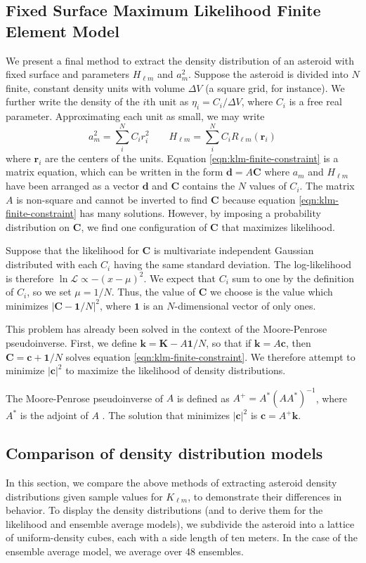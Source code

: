\documentclass{aastex631}
\begin{document}
\subsection{Fixed Surface Maximum Likelihood Finite Element Model}
\label{sec:like-density}
We present a final method to extract the density distribution of an asteroid with fixed surface and parameters $H_{\ell m}$ and $a_m^2$. Suppose the asteroid is divided into $N$ finite, constant density units with volume $\Delta V$ (a square grid, for instance). We further write the density of the $i$th unit as $\eta_i = C_i / \Delta V$, where $C_i$ is a free real parameter. Approximating each unit as small, we may write 
\begin{equation}
  a_m^2 = \sum_i^N C_i r_i^2 \qquad H_{\ell m} = \sum_i^N C_i R_{\ell m}(\bm r_i)
  \label{eqn:klm-finite-constraint}
\end{equation}
where $\bm r_i$ are the centers of the units. Equation \ref{eqn:klm-finite-constraint} is a matrix equation, which can be written in the form $\bm d = A \bm C$ where $a_m$ and $H_{\ell m}$ have been arranged as a vector $\bm d$ and $\bm C$ contains the $N$ values of $C_i$. The matrix $A$ is non-square and cannot be inverted to find $\bm C$ because equation \ref{eqn:klm-finite-constraint} has many solutions. However, by imposing a probability distribution on $\bm C$, we find one configuration of $\bm C$ that maximizes likelihood.

Suppose that the likelihood for $\bm C$ is multivariate independent Gaussian distributed with each $C_i$ having the same standard deviation. The log-likelihood is therefore $\ln \mathcal{L} \propto -(x - \mu)^2$. We expect that $C_{i}$ sum to one by the definition of $C_i$, so we set $\mu = 1/N$. Thus, the value of $\bm C$ we choose is the value which minimizes $|\bm C - \bm 1 /N|^2$, where $\bm 1$ is an $N$-dimensional vector of only ones.

This problem has already been solved in the context of the Moore-Penrose pseudoinverse. First, we define $\bm k = \bm K - A\bm 1/N$, so that if $\bm k = A \bm c$, then $\bm C = \bm c + \bm 1/N$ solves equation \ref{eqn:klm-finite-constraint}. We therefore attempt to minimize $|\bm c|^2$ to maximize the likelihood of density distributions.

The Moore-Penrose pseudoinverse of $A$ is defined as $A^+ = A^* (AA^*)^{-1}$, where $A^*$ is the adjoint of $A$ \cite{Barata2012}. The solution that minimizes $|\bm c|^2$ is $\bm c = A^+\bm k$. 


\subsection{Comparison of density distribution models}
In this section, we compare the above methods of extracting asteroid density distributions given sample values for $K_{\ell m}$, to demonstrate their differences in behavior. To display the density distributions (and to derive them for the likelihood and ensemble average models), we subdivide the asteroid into a lattice of uniform-density cubes, each with a side length of ten meters. In the case of the ensemble average model, we average over 48 ensembles.
\end{document}
